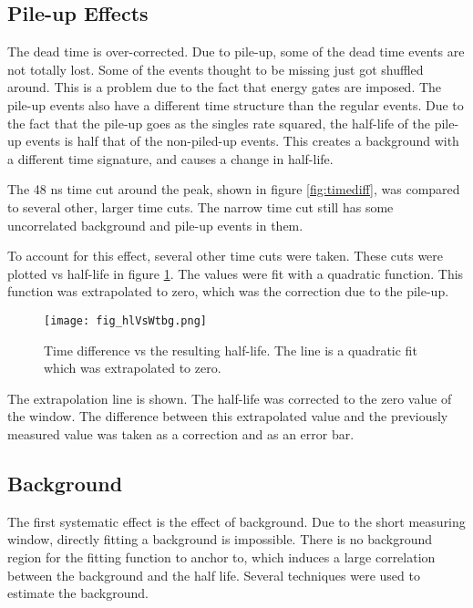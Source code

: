 \documentclass[MaxHughesThesis.tex]{subfiles}
\begin{document}
\subsection{Pile-up Effects}
The dead time is over-corrected. 
Due to pile-up, some of the dead time events are not totally lost.
Some of the events thought to be missing just got shuffled around.
This is a problem due to the fact that energy gates are imposed.
The pile-up events also have a different time structure than the regular events.
Due to the fact that the pile-up goes as the singles rate squared, the half-life of the pile-up events is half that of the non-piled-up events.
This creates a background with a different time signature, and causes a change in half-life.

The 48 ns time cut around the peak, shown in figure \ref{fig:timediff}, was compared to several other, larger time cuts.
The narrow time cut still has some uncorrelated background and pile-up events in them.


To account for this effect, several other time cuts were taken.
These cuts were plotted vs half-life in figure \ref{fig:timediffvhl}. 
The values were fit with a quadratic function.
This function was extrapolated to zero, which was the correction due to the pile-up.
 

\begin{figure}[!htb]
\centerline{\texttt{[image: fig\_hlVsWtbg.png]}}
\caption{Time difference vs the resulting half-life.
	 The line is a quadratic fit which was extrapolated to zero.
	}
\label{fig:timediffvhl}
\end{figure}
 
The extrapolation line is shown.
The half-life was corrected to the zero value of the window.
The difference between this extrapolated value and the previously measured value was taken as a correction and as an error bar.
 
\subsection{Background}

The first systematic effect is the effect of background.
Due to the short measuring window, directly fitting a background is impossible.
There is no background region for the fitting function to anchor to, which induces a large correlation between the background and the half life.
Several techniques were used to estimate the background.
\end{document}
